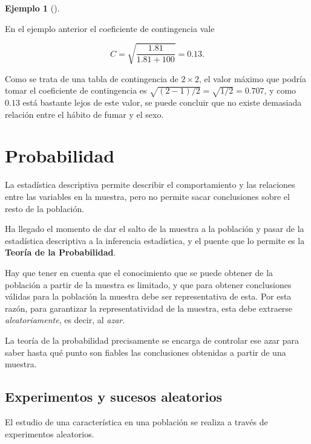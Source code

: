 \documentclass[
  spanish,
  a4paper,
]{scrreport}
\theoremstyle{plain}
\theoremstyle{definition}
\newtheorem{example}{Ejemplo}[chapter]
\theoremstyle{definition}
\theoremstyle{remark}
\begin{document}
\begin{example}[]\protect\hypertarget{exm-coeficiente-contingencia}{}\label{exm-coeficiente-contingencia}

En el ejemplo anterior el coeficiente de contingencia vale

\[
C = \sqrt{\frac{1.81}{1.81+100}} = 0.13.
\]

Como se trata de una tabla de contingencia de \(2\times 2\), el valor
máximo que podría tomar el coeficiente de contingencia es
\(\sqrt{(2-1)/2}=\sqrt{1/2}=0.707\), y como \(0.13\) está bastante lejos
de este valor, se puede concluir que no existe demasiada relación entre
el hábito de fumar y el sexo.

\end{example}


\chapter{Probabilidad}\label{probabilidad}

La estadística descriptiva permite describir el comportamiento y las
relaciones entre las variables en la muestra, pero no permite sacar
conclusiones sobre el resto de la población.

Ha llegado el momento de dar el salto de la muestra a la población y
pasar de la estadística descriptiva a la inferencia estadística, y el
puente que lo permite es la \textbf{Teoría de la Probabilidad}.

Hay que tener en cuenta que el conocimiento que se puede obtener de la
población a partir de la muestra es limitado, y que para obtener
conclusiones válidas para la población la muestra debe ser
representativa de esta. Por esta razón, para garantizar la
representatividad de la muestra, esta debe extraerse
\emph{aleatoriamente}, es decir, al \emph{azar}.

La teoría de la probabilidad precisamente se encarga de controlar ese
azar para saber hasta qué punto son fiables las conclusiones obtenidas a
partir de una muestra.

\section{Experimentos y sucesos
aleatorios}\label{experimentos-y-sucesos-aleatorios}

El estudio de una característica en una población se realiza a través de
experimentos aleatorios.
\end{document}
